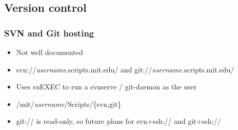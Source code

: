 \subsection{Version control}

\begin{frame}
  \frametitle{SVN and Git hosting}
  \begin{itemize}
    \item Not well documented
    \item svn://\textit{username}.scripts.mit.edu/ and git://\textit{username}.scripts.mit.edu/
    \item Uses suEXEC to run a svnserve / git-daemon as the user
    \item /mit/\textit{username}/Scripts/\{svn,git\}
    \item git:// is read-only, so future plans for svn+ssh:// and git+ssh://
  \end{itemize}
\end{frame}
